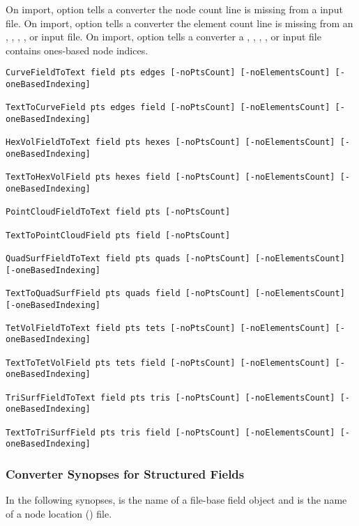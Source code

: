 On import, option  tells a converter the node
count line is missing from a  input file.  On import,
option  tells a converter the element count
line is missing from an , ,
, , or  input file.  On
import, option  tells a converter a
, , , , or
 input file contains ones-based node indices.

\begin{verbatim}
CurveFieldToText field pts edges [-noPtsCount] [-noElementsCount] [-oneBasedIndexing]

TextToCurveField pts edges field [-noPtsCount] [-noElementsCount] [-oneBasedIndexing]

HexVolFieldToText field pts hexes [-noPtsCount] [-noElementsCount] [-oneBasedIndexing]

TextToHexVolField pts hexes field [-noPtsCount] [-noElementsCount] [-oneBasedIndexing]

PointCloudFieldToText field pts [-noPtsCount]

TextToPointCloudField pts field [-noPtsCount]

QuadSurfFieldToText field pts quads [-noPtsCount] [-noElementsCount] [-oneBasedIndexing]

TextToQuadSurfField pts quads field [-noPtsCount] [-noElementsCount] [-oneBasedIndexing]

TetVolFieldToText field pts tets [-noPtsCount] [-noElementsCount] [-oneBasedIndexing]

TextToTetVolField pts tets field [-noPtsCount] [-noElementsCount] [-oneBasedIndexing]

TriSurfFieldToText field pts tris [-noPtsCount] [-noElementsCount] [-oneBasedIndexing]

TextToTriSurfField pts tris field [-noPtsCount] [-noElementsCount] [-oneBasedIndexing]
\end{verbatim}


\subsubsection{Converter Synopses for Structured Fields}
\label{sec:struct_field_synopses}

In the following synopses,  is the name of a \sr{}
file-base field object and  is the name of a node location
() file.

